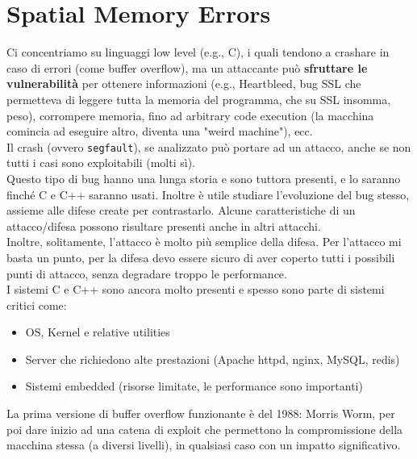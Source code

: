\section{Spatial Memory Errors}

Ci concentriamo su linguaggi low level (e.g., C), i quali tendono a crashare in caso di errori (come buffer overflow), ma un attaccante può \textbf{sfruttare le vulnerabilità} per ottenere informazioni (e.g., Heartbleed, bug SSL che permetteva di leggere tutta la memoria del programma, che su SSL insomma, peso), corrompere memoria, fino ad arbitrary code execution (la macchina comincia ad eseguire altro, diventa una "weird machine"), ecc.\\
Il crash (ovvero \texttt{segfault}), se analizzato può portare ad un attacco, anche se non tutti i casi sono exploitabili (molti sì).\\

Questo tipo di bug hanno una lunga storia e sono tuttora presenti, e lo saranno finché C e C++ saranno usati. Inoltre è utile studiare l'evoluzione del bug stesso, assieme alle difese create per contrastarlo. Alcune caratteristiche di un attacco/difesa possono risultare presenti anche in altri attacchi.\\

Inoltre, solitamente, l'attacco è molto più semplice della difesa. Per l'attacco mi basta un punto, per la difesa devo essere sicuro di aver coperto tutti i possibili punti di attacco, senza degradare troppo le performance.\\

I sistemi C e C++ sono ancora molto presenti e spesso sono parte di sistemi critici come: 
\begin{itemize}
	\item OS, Kernel e relative utilities
	\item Server che richiedono alte prestazioni (Apache httpd, nginx, MySQL, redis)
	\item Sistemi embedded (risorse limitate, le performance sono importanti)
\end{itemize}

La prima versione di buffer overflow funzionante è del 1988: Morris Worm, per poi dare inizio ad una catena di exploit che permettono la compromissione della macchina stessa (a diversi livelli), in qualsiasi caso con un impatto significativo.\\


